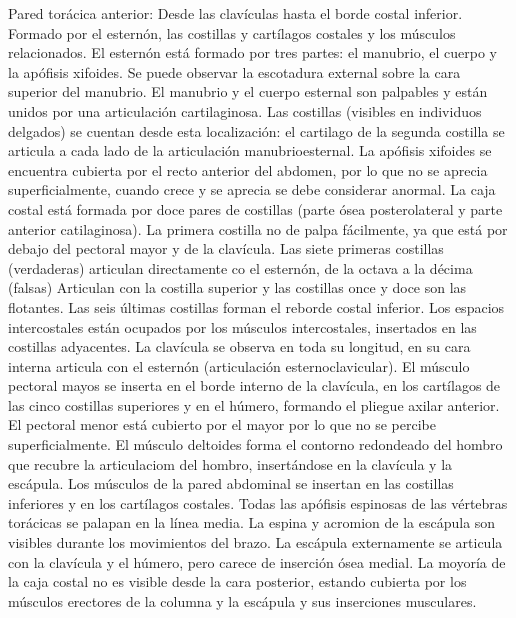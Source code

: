 Pared torácica anterior: Desde las clavículas hasta el borde costal inferior. Formado por el esternón, las costillas y cartílagos costales y los músculos relacionados.
El esternón está formado por tres partes: el manubrio, el cuerpo y la apófisis xifoides. Se puede observar la escotadura external sobre la cara superior del manubrio. El manubrio y el cuerpo esternal son palpables y están unidos por una articulación cartilaginosa. Las costillas (visibles en individuos delgados) se cuentan desde esta localización: el cartilago de la segunda costilla se articula a cada lado de la articulación manubrioesternal. La apófisis xifoides se encuentra cubierta por el recto anterior del abdomen, por lo que no se aprecia superficialmente, cuando crece y se aprecia se debe considerar anormal.
La caja costal está formada por doce pares de costillas (parte ósea posterolateral y parte anterior catilaginosa). La primera costilla no de palpa fácilmente, ya que está por debajo del pectoral mayor y de la clavícula. Las siete primeras costillas (verdaderas) articulan directamente co el esternón, de la octava a la décima (falsas) Articulan con la costilla superior y las costillas once y doce son las flotantes. Las seis últimas costillas forman el reborde costal inferior. Los espacios intercostales están ocupados por los músculos intercostales, insertados en las costillas adyacentes.
La clavícula se observa en toda su longitud, en su cara interna articula con  el esternón (articulación esternoclavicular).
El músculo pectoral mayos se inserta en el borde interno de la clavícula, en los cartílagos de las cinco costillas superiores y en el húmero, formando el pliegue axilar anterior. El pectoral menor está cubierto por el mayor por lo que no se percibe superficialmente.
El músculo deltoides forma el contorno redondeado del hombro que recubre la articulaciom del hombro, insertándose en la clavícula y la escápula.
Los músculos de la pared abdominal se insertan en las costillas inferiores y en los cartílagos costales.
Todas las apófisis espinosas de las vértebras torácicas se palapan en la línea media. La espina y acromion de la escápula son visibles durante los movimientos del brazo. La escápula externamente se articula con la clavícula y el húmero, pero carece de inserción ósea medial. La moyoría de la caja costal no es visible desde la cara posterior, estando cubierta por los músculos erectores de la columna y la escápula y sus inserciones musculares.


